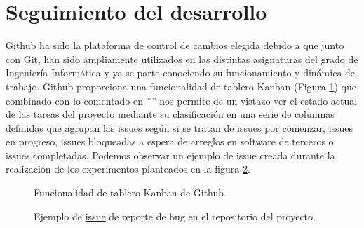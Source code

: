 \section{Seguimiento del desarrollo}
\label{seguimiento}
Github ha sido la plataforma de control de cambios elegida debido a que junto con Git, han sido ampliamente utilizados
en las distintas asignaturas del grado de Ingeniería Informática y ya se parte conociendo su funcionamiento y dinámica de 
trabajo. Github proporciona una funcionalidad de tablero Kanban (Figura \ref{fig:kanban}) que combinado con lo comentado en ''''
nos permite de un vistazo ver el estado actual de las tareas del proyecto mediante su clasificación en una serie de columnas 
definidas que agrupan las issues según si se tratan de issues por comenzar, issues en progreso, issues bloqueadas a espera 
de arreglos en software de terceros o issues completadas. Podemos observar un ejemplo de issue creada durante la realización de los 
experimentos planteados en la figura \ref{fig:issue}.
\begin{figure}[H]
    \caption{Funcionalidad de tablero Kanban de Github.}
    \label{fig:kanban}
\end{figure}

\begin{figure}[H]
    \caption{Ejemplo de \href{https://github.com/Olasergiolas/TFG/issues/11}{issue} de reporte de bug en el repositorio del proyecto.}
    \label{fig:issue}
\end{figure}
